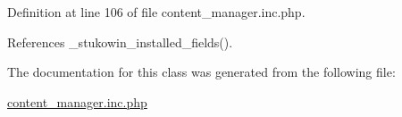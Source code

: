 Definition at line 106 of file content\+\_\+manager.\+inc.\+php.



References \+\_\+stukowin\+\_\+installed\+\_\+fields().



The documentation for this class was generated from the following file\+:\begin{DoxyCompactItemize}
\item 
\hyperlink{content__manager_8inc_8php}{content\+\_\+manager.\+inc.\+php}\end{DoxyCompactItemize}
